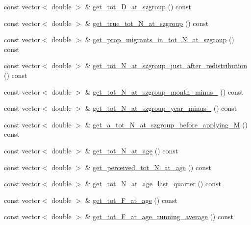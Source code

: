 \begin{DoxyCompactItemize}
\item 
const vector$<$ double $>$ \& \mbox{\hyperlink{class_population_ac404f9f743ec8bc167e363498aa40c04}{get\+\_\+tot\+\_\+\+D\+\_\+at\+\_\+szgroup}} () const
\item 
const vector$<$ double $>$ \& \mbox{\hyperlink{class_population_aaa50918cd90d97e8e9bfadb7f216a218}{get\+\_\+true\+\_\+tot\+\_\+\+N\+\_\+at\+\_\+szgroup}} () const
\item 
const vector$<$ double $>$ \& \mbox{\hyperlink{class_population_aa0aba8f408b3ebdbf48b775efb6f0f8a}{get\+\_\+prop\+\_\+migrants\+\_\+in\+\_\+tot\+\_\+\+N\+\_\+at\+\_\+szgroup}} () const
\item 
const vector$<$ double $>$ \& \mbox{\hyperlink{class_population_af5b3468bd3ecb69030f2f6a59e10253a}{get\+\_\+tot\+\_\+\+N\+\_\+at\+\_\+szgroup\+\_\+just\+\_\+after\+\_\+redistribution}} () const
\item 
const vector$<$ double $>$ \& \mbox{\hyperlink{class_population_a0cacac923ccbd019c7d397a0c6e1bff4}{get\+\_\+tot\+\_\+\+N\+\_\+at\+\_\+szgroup\+\_\+month\+\_\+minus\+\_}} () const
\item 
const vector$<$ double $>$ \& \mbox{\hyperlink{class_population_aa96c7a424f8288c20b65ac193f7ae498}{get\+\_\+tot\+\_\+\+N\+\_\+at\+\_\+szgroup\+\_\+year\+\_\+minus\+\_}} () const
\item 
const vector$<$ double $>$ \& \mbox{\hyperlink{class_population_a473a41f6a98055de0e65786f15fde216}{get\+\_\+a\+\_\+tot\+\_\+\+N\+\_\+at\+\_\+szgroup\+\_\+before\+\_\+applying\+\_\+M}} () const
\item 
const vector$<$ double $>$ \& \mbox{\hyperlink{class_population_a513cd369ddc2d0f523b68cb9cee54a29}{get\+\_\+tot\+\_\+\+N\+\_\+at\+\_\+age}} () const
\item 
const vector$<$ double $>$ \& \mbox{\hyperlink{class_population_aa05fb7270fafc2cc10c5280fa5a6d8d5}{get\+\_\+perceived\+\_\+tot\+\_\+\+N\+\_\+at\+\_\+age}} () const
\item 
const vector$<$ double $>$ \& \mbox{\hyperlink{class_population_a0b8d93dced62bc25ff70be9e1159230d}{get\+\_\+tot\+\_\+\+N\+\_\+at\+\_\+age\+\_\+last\+\_\+quarter}} () const
\item 
const vector$<$ double $>$ \& \mbox{\hyperlink{class_population_aa78f4be248f6d2febb02b4bfbbce12ba}{get\+\_\+tot\+\_\+\+F\+\_\+at\+\_\+age}} () const
\item 
const vector$<$ double $>$ \& \mbox{\hyperlink{class_population_a4169ce7af337dcc8551957e3b51040ce}{get\+\_\+tot\+\_\+\+F\+\_\+at\+\_\+age\+\_\+running\+\_\+average}} () const

\end{DoxyCompactItemize}
